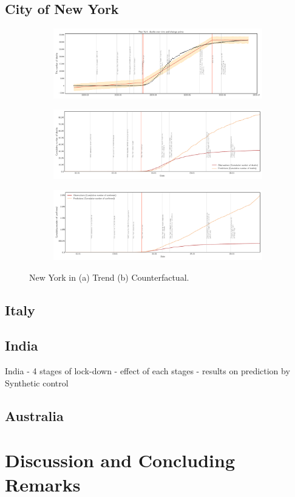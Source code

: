 \documentclass[preprint,authoryear,12pt]{elsarticle}
\begin{document}
	\subsection{City of New York}
	
		\begin{figure}
			\centering
			\begin{subfigure}[b]{\textwidth}
				\centering
				\includegraphics[width=0.9\linewidth,height=0.2\textheight]{New York_deaths_trend}
			\end{subfigure}
			
			\begin{subfigure}[b]{\textwidth}
				\centering
				\includegraphics[width=0.9\linewidth,height=0.2\textheight]{New York_deaths}
			\end{subfigure}

			\begin{subfigure}[b]{\textwidth}
				\centering
				\includegraphics[width=0.9\linewidth,height=0.2\textheight]{New York_confirmed}
			\end{subfigure}

			\caption[New York]{New York in (a) Trend (b) Counterfactual.}
			\label{fig3} 
		\end{figure}
	
	\subsection{Italy}
	
	\subsection{India}
	India - 4 stages of lock-down - effect of each stages - results on prediction by Synthetic control
	
	\subsection{Australia}

	
	\section{Discussion and Concluding Remarks}
	\label{SEC4}
	
	
	
		
\end{document}
